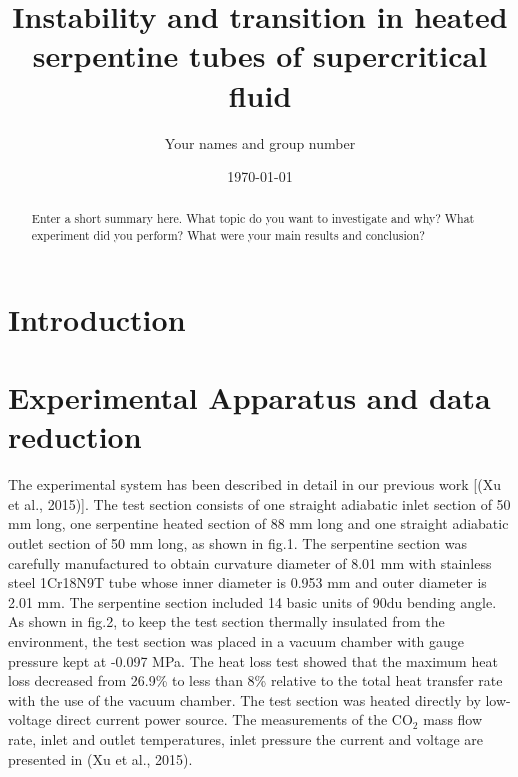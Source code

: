\documentclass[a4paper,12pt]{article}
\title{Instability and transition in heated serpentine tubes of supercritical fluid}
\author{Your names and group number}
\date{\today}
\begin{document}
\maketitle

\begin{abstract}
Enter a short summary here. What topic do you want to investigate and why? What experiment did you perform? What were your main results and conclusion?
\end{abstract}

\section{Introduction}
\label{sec:introduction}





\section{Experimental Apparatus and data reduction}
\label{sec:experiment}
The experimental system has been described in detail in our previous work [(Xu et al., 2015)]. The test section consists of one straight adiabatic inlet section of 50 mm long, one serpentine heated section of 88 mm long and one straight adiabatic outlet section of 50 mm long, as shown in fig.1. The serpentine section was carefully manufactured to obtain curvature diameter of 8.01 mm with stainless steel 1Cr18N9T tube whose inner diameter is 0.953 mm and outer diameter is 2.01 mm.  The serpentine section included 14 basic units of 90du bending angle. As shown in fig.2, to keep the test section thermally insulated from the environment, the test section was placed in a vacuum chamber with gauge pressure kept at -0.097 MPa. The heat loss test showed that the maximum heat loss decreased from 26.9\% to less than 8\% relative to the total heat transfer rate with the use of the vacuum chamber. The test section was heated directly by low-voltage direct current power source. The measurements of the CO$_2$ mass flow rate, inlet and outlet temperatures, inlet pressure the current and voltage are presented in (Xu et al., 2015).
\end{document}
